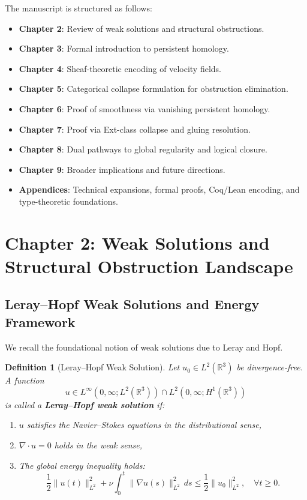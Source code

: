 \documentclass[11pt]{article}
\newtheorem{definition}[theorem]{Definition}
\begin{document}
The manuscript is structured as follows:
\begin{itemize}
  \item \textbf{Chapter 2}: Review of weak solutions and structural obstructions.
  \item \textbf{Chapter 3}: Formal introduction to persistent homology.
  \item \textbf{Chapter 4}: Sheaf-theoretic encoding of velocity fields.
  \item \textbf{Chapter 5}: Categorical collapse formulation for obstruction elimination.
  \item \textbf{Chapter 6}: Proof of smoothness via vanishing persistent homology.
  \item \textbf{Chapter 7}: Proof via Ext-class collapse and gluing resolution.
  \item \textbf{Chapter 8}: Dual pathways to global regularity and logical closure.
  \item \textbf{Chapter 9}: Broader implications and future directions.
  \item \textbf{Appendices}: Technical expansions, formal proofs, Coq/Lean encoding, and type-theoretic foundations.
\end{itemize}



\section{Chapter 2: Weak Solutions and Structural Obstruction Landscape}

\subsection{Leray–Hopf Weak Solutions and Energy Framework}

We recall the foundational notion of weak solutions due to Leray and Hopf.

\begin{definition}[Leray–Hopf Weak Solution]
Let \( u_0 \in L^2(\mathbb{R}^3) \) be divergence-free. A function
\[
u \in L^\infty(0,\infty; L^2(\mathbb{R}^3)) \cap L^2(0,\infty; H^1(\mathbb{R}^3))
\]
is called a \textbf{Leray–Hopf weak solution} if:
\begin{enumerate}
  \item \( u \) satisfies the Navier–Stokes equations in the distributional sense,
  \item \( \nabla \cdot u = 0 \) holds in the weak sense,
  \item The global energy inequality holds:
  \[
  \frac{1}{2} \|u(t)\|_{L^2}^2 + \nu \int_0^t \|\nabla u(s)\|_{L^2}^2 \, ds \leq \frac{1}{2} \|u_0\|_{L^2}^2, \quad \forall t \geq 0.
  \]
\end{enumerate}
\end{definition}
\end{document}

